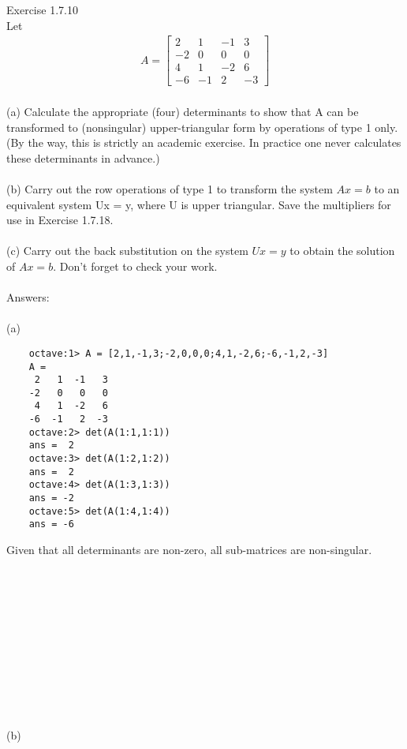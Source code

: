 \documentclass[10pt,a4paper]{article}
\author{Daniel Frederico Lins Leite}
\begin{document}
	
	Exercise 1.7.10\\
	Let\\
	\begin{align*}
		A = \begin{bmatrix}
		2&1&-1&3\\-2&0&0&0\\4&1&-2&6\\-6&-1&2&-3
		\end{bmatrix}
	\end{align*}	
	\\
	(a) Calculate the appropriate (four) determinants to show that A can be transformed to (nonsingular) upper-triangular form by operations of type 1 only. (By the way, this is strictly an academic exercise. In practice one never calculates these determinants in advance.)\\ 
	\\
	(b) Carry out the row operations of type 1 to transform the system $Ax = b$ to an equivalent system Ux = y, where U is upper triangular. Save the multipliers 
	for use in Exercise 1.7.18.\\
	\\
	(c) Carry out the back substitution on the system $Ux = y$ to obtain the solution of $Ax = b$. Don't forget to check your work.\\
	\\
	Answers:\\
	\\
	(a)
	\begin{verbatim}
	octave:1> A = [2,1,-1,3;-2,0,0,0;4,1,-2,6;-6,-1,2,-3]
	A =	
	 2   1  -1   3
	-2   0   0   0
	 4   1  -2   6
	-6  -1   2  -3	
	octave:2> det(A(1:1,1:1))
	ans =  2
	octave:3> det(A(1:2,1:2))
	ans =  2
	octave:4> det(A(1:3,1:3))
	ans = -2
	octave:5> det(A(1:4,1:4))
	ans = -6
	\end{verbatim}
	Given that all determinants are non-zero, all sub-matrices are non-singular.\\
	\\ \\ \\ \\ \\ \\ \\ \\ \\ \\ \\
	(b)
	\\
\end{document}
